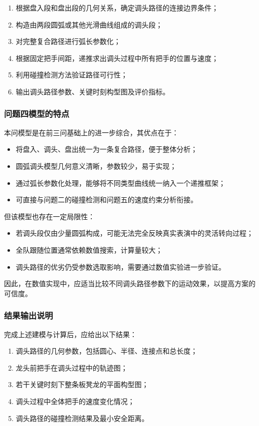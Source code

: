 \documentclass[12pt,a4paper]{ctexart}
\begin{document}
\begin{enumerate}
    \item 根据盘入段和盘出段的几何关系，确定调头路径的连接边界条件；
    \item 构造由两段圆弧或其他光滑曲线组成的调头段；
    \item 对完整复合路径进行弧长参数化；
    \item 根据固定把手间距，递推求出调头过程中所有把手的位置与速度；
    \item 利用碰撞检测方法验证路径可行性；
    \item 输出调头路径参数、关键时刻构型图及评价指标。
\end{enumerate}

\subsubsection{问题四模型的特点}
本问模型是在前三问基础上的进一步综合，其优点在于：

\begin{itemize}
    \item 将盘入、调头、盘出统一为一条复合路径，便于整体分析；
    \item 圆弧调头模型几何意义清晰，参数较少，易于实现；
    \item 通过弧长参数化处理，能够将不同类型曲线统一纳入一个递推框架；
    \item 可直接与问题二的碰撞检测和问题五的速度约束分析衔接。
\end{itemize}

但该模型也存在一定局限性：

\begin{itemize}
    \item 若调头段仅由少量圆弧构成，可能无法完全反映真实表演中的灵活转向过程；
    \item 全队跟随位置通常依赖数值搜索，计算量较大；
    \item 调头路径的优劣仍受参数选取影响，需要通过数值实验进一步验证。
\end{itemize}

因此，在数值实现中，应适当比较不同调头路径参数下的运动效果，以提高方案的可信度。

\subsubsection{结果输出说明}
完成上述建模与计算后，应给出以下结果：

\begin{enumerate}
    \item 调头路径的几何参数，包括圆心、半径、连接点和总长度；
    \item 龙头前把手在调头过程中的轨迹图；
    \item 若干关键时刻下整条板凳龙的平面构型图；
    \item 调头过程中全体把手的速度变化情况；
    \item 调头路径的碰撞检测结果及最小安全距离。
\end{enumerate}
\end{document}
